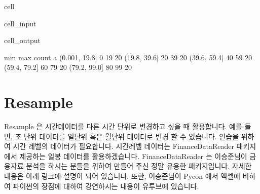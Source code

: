 \documentclass[letterpaper,10pt,english]{jupyterBook}
\begin{document}
\begin{sphinxuseclass}{cell}\begin{sphinxVerbatimInput}

\begin{sphinxuseclass}{cell_input}
\begin{sphinxVerbatim}[commandchars=\\\{\}]
  \PYG{p}{[}\PYG{p}{]} 
\PYG{p}{[}\PYG{p}{]}\PYG{p}{[}\PYG{p}{]}
\end{sphinxVerbatim}

\end{sphinxuseclass}\end{sphinxVerbatimInput}
\begin{sphinxVerbatimOutput}

\begin{sphinxuseclass}{cell_output}
\begin{sphinxVerbatim}[commandchars=\\\{\}]
                min  max  count
a                              
(\PYGZhy{}0.001, 19.8]    0   19     20
(19.8, 39.6]     20   39     20
(39.6, 59.4]     40   59     20
(59.4, 79.2]     60   79     20
(79.2, 99.0]     80   99     20
\end{sphinxVerbatim}

\end{sphinxuseclass}\end{sphinxVerbatimOutput}

\end{sphinxuseclass}

\section{Resample}
\label{\detokenize{chapter2/2.2.4_Useful_Techniques:resample}}\label{\detokenize{chapter2/2.2.4_Useful_Techniques::doc}}
\sphinxAtStartPar
Resample 은 시간데이터를 다른 시간 단위로 변경하고 싶을 때 활용합니다. 예를 들면, 초 단위 데이터를 일단위 혹은 월단위 데이터로 변경 할 수 있습니다. 연습을 위하여 시간 레벨의 데이터가 필요합니다. 시간레벨 데이터는 FinanceDataReader 패키지에서 제공하는 일봉 데이터를 활용하겠습니다. FinanceDataReader 는 이승준님이 금융자료 분석을 하시는 분들을 위하여 만들어 주신 정말 유용한 패키지입니다. 자세한 내용은 아래 링크에 설명이 되어 있습니다.
 또한, 이승준님이 Pycon 에서 엑셀에 비하여 파이썬의 장점에 대하여 강연하시는 내용이 유투브에 있습니다. 
\end{document}
